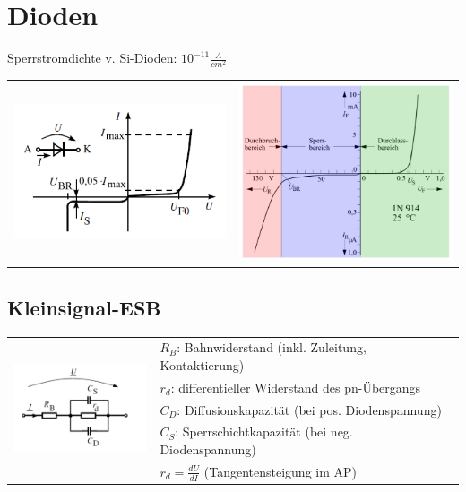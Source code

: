 \section{Dioden}
	Sperrstromdichte v. Si-Dioden: $10^{-11} \frac{A}{cm^2}$ \\
	\begin{tabular}{l l}
			\includegraphics[width=8cm]{./images/Diode-Kennlinie.png}
		&	\includegraphics[width=8cm]{./images/Diode-Kennlinie-2.png}
	\end{tabular}
	
	\subsection{Kleinsignal-ESB}
		\begin{tabular}{l l}
			\multirow{5}{*}{\includegraphics[width=4cm]{./images/Diode-KS-ESB.png}}
			& $R_B$: Bahnwiderstand (inkl. Zuleitung, Kontaktierung) \\
			& $r_d$: differentieller Widerstand des pn-Übergangs \\
			& $C_D$: Diffusionskapazität (bei pos. Diodenspannung) \\
			& $C_S$: Sperrschichtkapazität (bei neg. Diodenspannung)\\
			& $r_d=\frac{dU}{dI}$ (Tangentensteigung im AP) \\
		\end{tabular}
	
